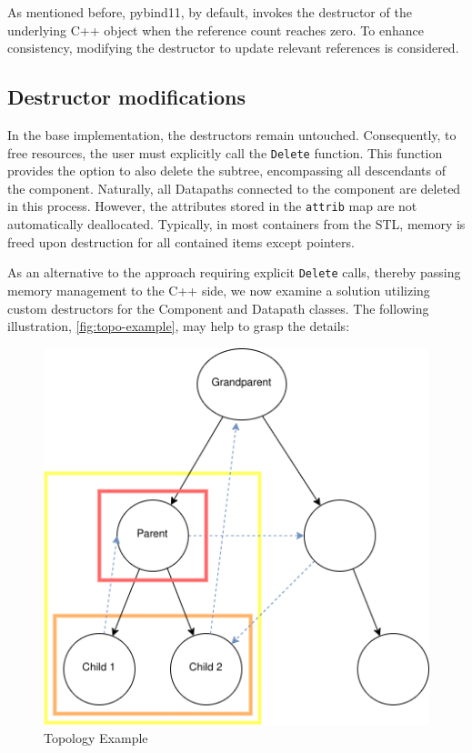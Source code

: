 As mentioned before, pybind11, by default, invokes the destructor of the underlying C++ object when the reference count reaches zero. To enhance consistency, modifying the destructor to update relevant references is considered. 

\subsection{Destructor modifications}

In the base implementation, the destructors remain untouched. Consequently, to free resources, the user must explicitly call the \verb|Delete| function. This function provides the option to also delete the subtree, encompassing all descendants of the component. Naturally, all Datapaths connected to the component are deleted in this process. However, the attributes stored in the \verb|attrib| map are not automatically deallocated. Typically, in most containers from the \ac{STL}, memory is freed upon destruction for all contained items except pointers.\cite{cppreference-map-destructor}

As an alternative to the approach requiring explicit \verb|Delete| calls, thereby passing memory management to the C++ side, we now examine a solution utilizing custom destructors for the Component and Datapath classes. The following illustration, \autoref{fig:topo-example}, may help to grasp the details:
\begin{figure}[htpb]
    \centering
    \includegraphics[scale=0.5]{figures/Topo-example.png}
    \caption{Topology Example}
    \label{fig:topo-example}
\end{figure}

